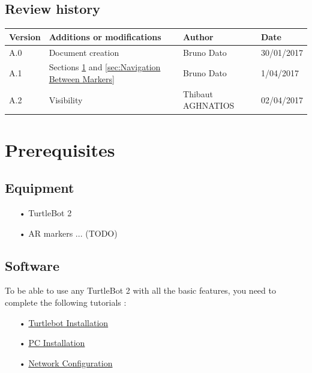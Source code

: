 \documentclass[10pt,a4paper]{article}
\begin{document}
\subsection*{Review history}

\begin{center}
    \begin{tabular}{| l | l | l | l |}
    \hline
     \rowcolor{gray} Version & Additions or modifications & Author & Date \\ \hline
    A.0 & Document creation & Bruno Dato & 30/01/2017\\ \hline
    A.1 & Sections \ref{sec:Prerequisites} and \ref{sec:Navigation Between Markers} & Bruno Dato & 1/04/2017\\ \hline
    A.2 & Visibility & Thibaut AGHNATIOS & 02/04/2017\\ \hline
     
    \end{tabular}
\end{center}

\newpage
\tableofcontents
\newpage
	

\section{Prerequisites}
\label{sec:Prerequisites}

\subsection{Equipment}

\begin{itemize}
\item[•] TurtleBot 2
\item[•] AR markers ... (TODO)
\end{itemize}

\subsection{Software}

To be able to use any TurtleBot 2 with all the basic features, you need to complete the following tutorials :

\begin{itemize}
\item[•] \href{http://wiki.ros.org/turtlebot/Tutorials/indigo/Turtlebot%20Installation}{Turtlebot Installation} 
\item[•] \href{http://wiki.ros.org/turtlebot/Tutorials/indigo/PC%20Installation}{PC Installation} 
\item[•] \href{http://wiki.ros.org/turtlebot/Tutorials/indigo/Network%20Configuration}{Network Configuration} 
\end{itemize}
\end{document}
